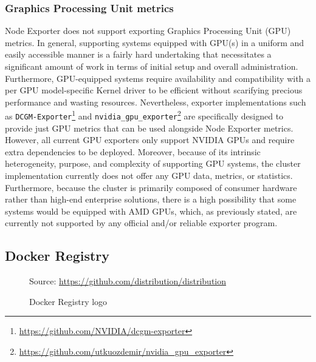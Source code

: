 \subsubsection{Graphics Processing Unit metrics}
\label{subsubsec:implementation_dependencies_node_exporter_graphics_processing_unit_metrics}

Node Exporter does not support exporting Graphics Processing Unit (GPU) metrics.
In general, supporting systems equipped with GPU(s) in a uniform and easily
accessible manner is a fairly hard undertaking that necessitates a significant
amount of work in terms of initial setup and overall administration. Furthermore,
GPU-equipped systems require availability and compatibility with a per GPU model-specific
Kernel driver to be efficient without scarifying precious performance and
wasting resources. Nevertheless, exporter implementations such as \texttt{DCGM-Exporter}\footnote{\url{https://github.com/NVIDIA/dcgm-exporter}}
and \texttt{nvidia\_gpu\_exporter}\footnote{\url{https://github.com/utkuozdemir/nvidia_gpu_exporter}}
are specifically designed to provide just GPU metrics that can be used alongside
Node Exporter metrics. However, all current GPU exporters only support NVIDIA
GPUs and require extra dependencies to be deployed. Moreover, because of its
intrinsic heterogeneity, purpose, and complexity of supporting GPU systems, the cluster
implementation currently does not offer any GPU data, metrics, or statistics.
Furthermore, because the cluster is primarily composed of consumer hardware rather
than high-end enterprise solutions, there is a high possibility that some
systems would be equipped with AMD GPUs, which, as previously stated, are currently
not supported by any official and/or reliable exporter program.

\subsection{Docker Registry}
\label{subsec:implementation_dependencies_docker_registry}

\begin{figure} %
  \centering
  \def\stackalignment{l} %
  {\scriptsize \parbox[t]{\linewidth}{ Source: \url{https://github.com/distribution/distribution}} }
  \caption{Docker Registry logo}
\end{figure}

